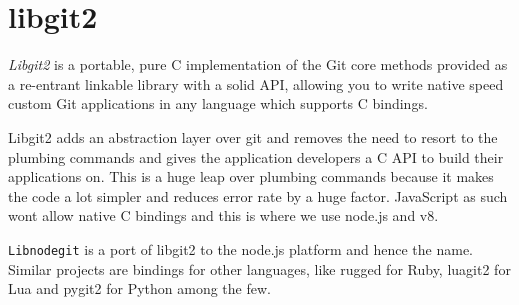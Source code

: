 \section{libgit2}

\textit{Libgit2}\cite{libgit2} is a portable, pure C implementation of the Git
core methods provided as a re-entrant linkable library with a solid API,
allowing you to write native speed custom Git applications in any language which
supports C bindings.

Libgit2 adds an abstraction layer over git and removes the need to resort to the
plumbing commands and gives the application developers a C API to build their
applications on. This is a huge leap over plumbing commands because it makes the
code a lot simpler and reduces error rate by a huge factor. JavaScript as such
wont allow native C bindings and this is where we use node.js and v8.

\texttt{Libnodegit} is a port of libgit2 to the node.js platform and hence the
name. Similar projects are bindings for other languages, like
rugged\cite{rugged} for Ruby, luagit2\cite{luagit2} for Lua and
pygit2\cite{pygit2} for Python among the few.
